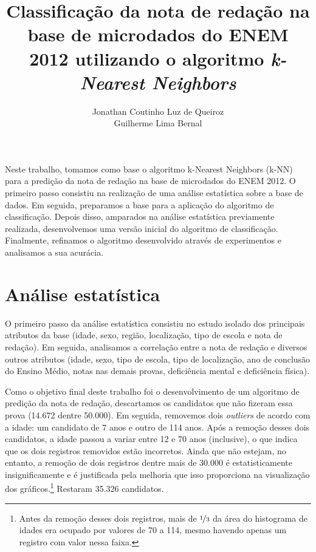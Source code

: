 \documentclass[12pt]{article}
\title{Classificação da nota de redação na base de microdados do ENEM 2012 utilizando o algoritmo \emph{k-Nearest Neighbors}}
\author{Jonathan Coutinho Luz de Queiroz\inst{1} \\ Guilherme Lima Bernal\inst{1}}
\begin{document}
 

\maketitle

\begin{resumo}
Neste trabalho, tomamos como base o algoritmo k-Nearest Neighbors (k-NN) para a predição da nota de redação na base de microdados do ENEM 2012.
O primeiro passo consistiu na realização de uma análise estatística sobre a base de dados.
Em seguida, preparamos a base para a aplicação do algoritmo de classificação.
Depois disso, amparados na análise estatística previamente realizada, desenvolvemos uma versão inicial do algoritmo de classificação.
Finalmente, refinamos o algoritmo desenvolvido através de experimentos e analisamos a sua acurácia.
\end{resumo}


\section{Análise estatística}
O primeiro passo da análise estatística consistiu no estudo isolado dos principais atributos da base (idade, sexo, região, localização, tipo de escola e nota de redação).
Em seguida, analisamos a correlação entre a nota de redação e diversos outros atributos (idade, sexo, tipo de escola, tipo de localização, ano de conclusão do Ensino Médio, notas nas demais provas, deficiência mental e deficiência física).

Como o objetivo final deste trabalho foi o desenvolvimento de um algoritmo de predição da nota de redação, descartamos os candidatos que não fizeram essa prova (14.672 dentre 50.000).
Em seguida, removemos dois \emph{outliers} de acordo com a idade: um candidato de 7 anos e outro de 114 anos.
Após a remoção desses dois candidatos, a idade passou a variar entre 12 e 70 anos (inclusive), o que indica que os dois registros removidos estão incorretos.
Ainda que não estejam, no entanto, a remoção de dois registros dentre mais de 30.000 é estatisticamente insignificamente e é justificada pela melhoria que isso proporciona na visualização dos gráficos.\footnote{Antes da remoção desses dois registros, mais de $\nicefrac{1}{3}$ da área do histograma de idades era ocupado por valores de 70 a 114, mesmo havendo apenas um registro com valor nessa faixa.}
Restaram 35.326 candidatos.
\end{document}
